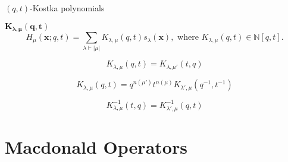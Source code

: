 \documentclass[12pt]{amsart}
\begin{document}
\vspace{-10pt}
\begin{mdframed}[linecolor=cyan!20,linewidth=3pt,innertopmargin=8pt]
	\begin{minipage}[t]{12cm}
		\begin{bf}$(q,t)$-Kostka polynomials \end{bf} $\bm{K_{\lambda,\mu}(q,t)}$
		\begin{equation}
H_\mu(\bm{x};q,t)=\sum_{\lambda\vdash |\mu|} K_{\lambda,\mu}(q,t)s_\lambda(\bm{x}), \text{ where } K_{\lambda,\mu}(q,t)\in \mathbb{N}[q,t].
		\end{equation}
	\end{minipage}
	\begin{minipage}[t]{7.75cm}
		\begin{equation}K_{\lambda,\mu}(q,t)=K_{\lambda,\mu'}(t,q)
		\end{equation}
	\end{minipage}


	 \begin{minipage}[t]{12cm}
		\begin{equation}K_{\lambda,\mu}(q,t)=q^{n(\mu')}t^{n(\mu)}K_{\lambda',\mu}(q^{-1},t^{-1})
		\end{equation}
	\end{minipage}
	\begin{minipage}[t]{7.75cm}
		\begin{equation}K^{-1}_{\lambda,\mu}(t,q)=K^{-1}_{\lambda',\mu}(q,t)
	\end{equation}
	\end{minipage}
\end{mdframed}


\section{Macdonald Operators}
\end{document}
